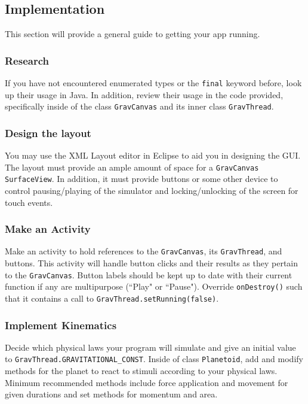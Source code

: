 \subsection{Implementation}
This section will provide a general guide to getting your app running.

\subsubsection{Research}
If you have not encountered enumerated types or the \verb=final= keyword before, look up their usage in Java.
In addition, review their usage in the code provided, specifically inside of the class \verb=GravCanvas= and its inner class \verb=GravThread=.

\subsubsection{Design the layout}
You may use the XML Layout editor in Eclipse to aid you in designing the GUI.
The layout must provide an ample amount of space for a \verb=GravCanvas SurfaceView=.
In addition, it must provide buttons or some other device to control pausing/playing of the simulator and locking/unlocking of the screen for touch events.

\subsubsection{Make an Activity}
Make an activity to hold references to the \verb=GravCanvas=, its \verb=GravThread=, and buttons.
This activity will handle button clicks and their results as they pertain to the \verb=GravCanvas=.
Button labels should be kept up to date with their current function if any are multipurpose (``Play" or ``Pause").
Override \verb=onDestroy()= such that it contains a call to \verb=GravThread.setRunning(false)=.

\subsubsection{Implement Kinematics}
Decide which physical laws your program will simulate and give an initial value to \verb=GravThread.GRAVITATIONAL_CONST=.
Inside of class \verb=Planetoid=, add and modify methods for the planet to react to stimuli according to your physical laws.
Minimum recommended methods include force application and movement for given durations and set methods for momentum and area.


